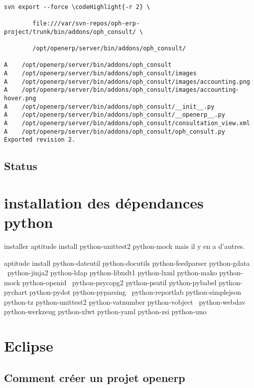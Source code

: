 \documentclass[12pt,a4paper]{article}
\newcommand\codeHighlight[1]{\textcolor[rgb]{1,0,0}{\textbf{#1}}}
\begin{document}
\begin{verbatim}

svn export --force \codeHighlight{-r 2} \

        file:///var/svn-repos/oph-erp-project/trunk/bin/addons/oph_consult/ \

        /opt/openerp/server/bin/addons/oph_consult/

A    /opt/openerp/server/bin/addons/oph_consult
A    /opt/openerp/server/bin/addons/oph_consult/images
A    /opt/openerp/server/bin/addons/oph_consult/images/accounting.png
A    /opt/openerp/server/bin/addons/oph_consult/images/accounting-hover.png
A    /opt/openerp/server/bin/addons/oph_consult/__init__.py
A    /opt/openerp/server/bin/addons/oph_consult/__openerp__.py
A    /opt/openerp/server/bin/addons/oph_consult/consultation_view.xml
A    /opt/openerp/server/bin/addons/oph_consult/oph_consult.py
Exported revision 2.
\end{verbatim}

\subsection{Status}
\label{sec:status}

\section{installation des dépendances python}
\label{sec:deppython}

installer 
aptitude install python-unittest2 python-mock mais il y en a d'autres.


aptitude install python-dateutil python-docutils python-feedparser python-gdata \
python-jinja2 python-ldap python-libxslt1 python-lxml python-mako python-mock python-openid \
python-psycopg2 python-psutil python-pybabel python-pychart python-pydot python-pyparsing \
python-reportlab python-simplejson python-tz python-unittest2 python-vatnumber python-vobject \
python-webdav python-werkzeug python-xlwt python-yaml python-zsi python-uno
\section{Eclipse}
\label{sec:eclipse}

\subsection{Comment créer un projet openerp}
\label{sec:create_project}
\end{document}
